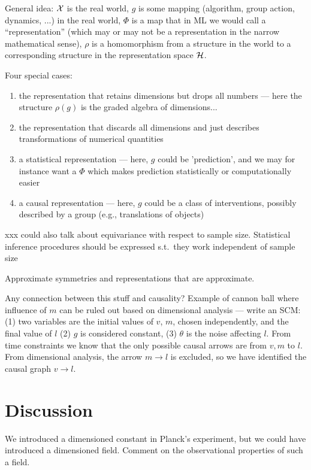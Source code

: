 \documentclass{article}
\begin{document}
General idea: $\cal X$ is the real world, $g$ is some mapping (algorithm, group action, dynamics, ...) in the real world, $\Phi$ is a map that in ML we would call a ``representation'' (which may or may not be a representation in the narrow mathematical sense), $\rho$ is a homomorphism from a structure in the world to a corresponding structure in the representation space $\cal H$.

Four special cases:
\begin{enumerate}
    \item the representation that retains dimensions but drops all numbers --- here the structure $\rho(g)$ is the graded algebra of dimensions...
    \item the representation that discards all dimensions and just describes transformations of numerical quantities
    \item a statistical representation --- here, $g$ could be 'prediction', and we may for instance want a $\Phi$ which makes prediction statistically or computationally easier
    \item a causal representation --- here, $g$ could be a class of interventions, possibly described by a group (e.g., translations of objects)
\end{enumerate}

xxx could also talk about equivariance with respect to sample size. Statistical inference procedures should be expressed s.t.\ they work independent of sample size



Approximate symmetries and representations that are approximate.

Any connection between this stuff and causality?
Example of cannon ball where influence of $m$ can be ruled out based on dimensional analysis --- write an SCM: (1) two variables are the initial values of $v$, $m$, chosen independently, and the final value of $l$ (2) $g$ is considered constant, (3) $\theta$ is the noise affecting $l$. From time constraints we know that the only possible causal arrows are from $v, m$ to $l$. From dimensional analysis, the arrow $m\to l$ is excluded, so we have identified the causal graph $v\to l$.

\section{Discussion}
We introduced a dimensioned constant in Planck's experiment, but we could have introduced a dimensioned field. Comment on the observational properties of such a field.  
\end{document}
